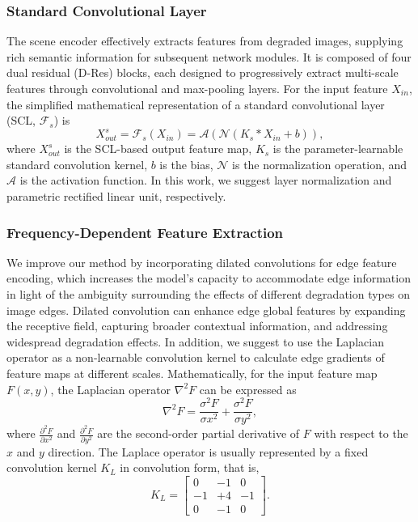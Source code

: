 \documentclass[final,12pt]{elsarticle}
\begin{document}
\subsubsection{Standard Convolutional Layer}
%
    The scene encoder effectively extracts features from degraded images, supplying rich semantic information for subsequent network modules. It is composed of four dual residual (D-Res) blocks, each designed to progressively extract multi-scale features through convolutional and max-pooling layers. For the input feature $X_{in}$, the simplified mathematical representation of a standard convolutional layer (SCL, $\mathcal{F}_s$) is
    \begin{equation}   
        X_{out}^s = \mathcal{F}_s(X_{in}) = \mathcal{A}(\mathcal{N}(K_s * X_{in} + b)),
    \end{equation}  
    where $X_{out}^s$ is the SCL-based output feature map, $K_s$ is the parameter-learnable standard convolution kernel, $b$ is the bias, $\mathcal{N}$ is the normalization operation, and $\mathcal{A}$ is the activation function. In this work, we suggest layer normalization and parametric rectified linear unit, respectively. 
%
\subsubsection{Frequency-Dependent Feature Extraction}
%  
    We improve our method by incorporating dilated convolutions for edge feature encoding, which increases the model's capacity to accommodate edge information in light of the ambiguity surrounding the effects of different degradation types on image edges. Dilated convolution can enhance edge global features by expanding the receptive field, capturing broader contextual information, and addressing widespread degradation effects. In addition, we suggest to use the Laplacian operator as a non-learnable convolution kernel to calculate edge gradients of feature maps at different scales. Mathematically, for the input feature map $F(x,y)$, the Laplacian operator $\nabla^2 F$ can be expressed as
    \begin{equation}
        \nabla^2 F=\frac{\sigma^2 F}{\sigma x^2}+\frac{\sigma^2 F}{\sigma y^2},
    \end{equation}
    where $\frac{\partial^2 F}{\partial x^2}$ and $\frac{\partial^2 F}{\partial y^2}$ are the second-order partial derivative of $F$ with respect to the $x$ and $y$ direction. The Laplace operator is usually represented by a fixed convolution kernel $K_L$ in convolution form, that is,
    \begin{equation}\label{eq:lapkernel}
        K_L = \begin{bmatrix}
        0 & -1 & 0 \\
        -1 & +4 & -1 \\
        0 & -1 & 0
        \end{bmatrix}.
    \end{equation}
    
\end{document}
